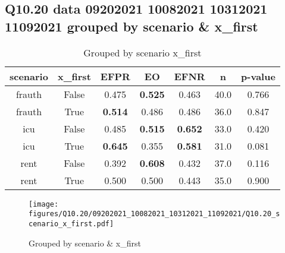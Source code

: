 \subsection{Q10.20 data 09202021 10082021 10312021 11092021 grouped by scenario \& x_first}

\begin{comment}
                     EFPR        EO      EFNR     n    pvalue
(frauth, False)  0.475000  0.525000  0.462500  40.0  0.765738
(frauth, True)   0.513889  0.486111  0.486111  36.0  0.847316
(icu, False)     0.484848  0.515152  0.651515  33.0  0.419930
(icu, True)      0.645161  0.354839  0.580645  31.0  0.081224
(rent, False)    0.391892  0.608108  0.432432  37.0  0.115944
(rent, True)     0.500000  0.500000  0.442857  35.0  0.900056
\end{comment}

\begin{table}[h]
    \centering
    \begin{tabular}{|c|c|c|c|c|c|c|}
        \hline
        scenario & x_first & EFPR & EO & EFNR & n & p-value\\
        \hline
        frauth & False & 0.475 & \textbf{0.525} & 0.463 & 40.0 & 0.766\\
		frauth & True & \textbf{0.514} & 0.486 & 0.486 & 36.0 & 0.847\\
		icu & False & 0.485 & \textbf{0.515} & \textbf{0.652} & 33.0 & 0.420\\
		icu & True & \textbf{0.645} & 0.355 & \textbf{0.581} & 31.0 & 0.081\\
		rent & False & 0.392 & \textbf{0.608} & 0.432 & 37.0 & 0.116\\
		rent & True & 0.500 & 0.500 & 0.443 & 35.0 & 0.900\\
		
        \hline
    \end{tabular}
    \caption{Grouped by scenario x_first}
    \label{tab:my_label}
\end{table}
\begin{figure}[h]
    \centering
    \texttt{[image: figures/Q10.20/09202021\_10082021\_10312021\_11092021/Q10.20\_scenario\_x\_first.pdf]}
    \caption{Grouped by scenario \& x_first}
    \label{fig:my_label}
\end{figure}
